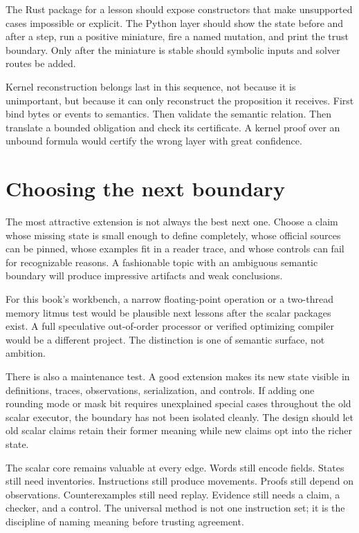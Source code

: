 The Rust package for a lesson should expose constructors that make unsupported
cases impossible or explicit. The Python layer should show the state before
and after a step, run a positive miniature, fire a named mutation, and print
the trust boundary. Only after the miniature is stable should symbolic inputs
and solver routes be added.

Kernel reconstruction belongs last in this sequence, not because it is
unimportant, but because it can only reconstruct the proposition it receives.
First bind bytes or events to semantics. Then validate the semantic relation.
Then translate a bounded obligation and check its certificate. A kernel proof
over an unbound formula would certify the wrong layer with great confidence.

\section{Choosing the next boundary}

The most attractive extension is not always the best next one. Choose a claim
whose missing state is small enough to define completely, whose official
sources can be pinned, whose examples fit in a reader trace, and whose controls
can fail for recognizable reasons. A fashionable topic with an ambiguous
semantic boundary will produce impressive artifacts and weak conclusions.

For this book's workbench, a narrow floating-point operation or a two-thread
memory litmus test would be plausible next lessons after the scalar packages
exist. A full speculative out-of-order processor or verified optimizing
compiler would be a different project. The distinction is one of semantic
surface, not ambition.

There is also a maintenance test. A good extension makes its new state visible
in definitions, traces, observations, serialization, and controls. If adding
one rounding mode or mask bit requires unexplained special cases throughout
the old scalar executor, the boundary has not been isolated cleanly. The
design should let old scalar claims retain their former meaning while new
claims opt into the richer state.

The scalar core remains valuable at every edge. Words still encode fields.
States still need inventories. Instructions still produce movements. Proofs
still depend on observations. Counterexamples still need replay. Evidence still
needs a claim, a checker, and a control. The universal method is not one
instruction set; it is the discipline of naming meaning before trusting
agreement.

